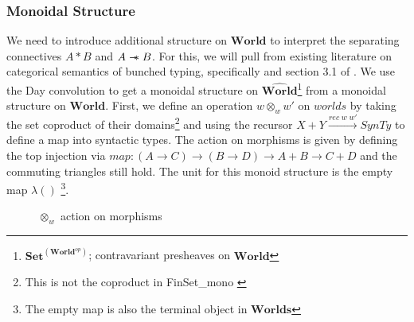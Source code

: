 \documentclass{article}
\newcommand{\sep}{\mathrel{-\mkern-6mu*}}
\newcommand{\pworld}{\widehat{\mathbf{World}}}
\newcommand{\world}{{\mathbf{World}}}
\begin{document}
 
\begin{comment}
Previously, I had maps between worlds as injections where the source map was 
included in the domain map. I've flipped the ordering to make the DCC obviously 
affine(monoidal unit is isomorphic to cartesian unit).    
\end{comment}



  \subsubsection{Monoidal Structure}

  We need to introduce additional structure on $\world$ to interpret the 
  separating connectives $A * B$ and $A\sep B$. For this, we will pull 
  from existing literature on categorical semantics of bunched typing, 
  specifically \cite{ohearnResourceInterpretationsBunched1999} and section 3.1 of \cite{pym_semantics_2002}. 
  We use the Day convolution \cite{nlabDayConv} to get a monoidal structure on 
  $\pworld$\footnote{$\mathbf{Set}^{(\world^{op})}$; contravariant presheaves on $\world$} 
  from a monoidal structure on $\world$. First, we define an operation $w \otimes_w w'$ on $worlds$ by taking 
  the set coproduct of their domains\footnote{This is not the coproduct in FinSet\_mono \cite{SE-FinSetMonoCoprod}} 
  and using the recursor $X + Y \xrightarrow{rec \; w \; w'} SynTy$ 
  to define a map into syntactic types. The action on morphisms 
  is given by defining the top injection via $map : (A \rightarrow C) \rightarrow 
  (B \rightarrow D) \rightarrow A + B \rightarrow C + D$ and the commuting triangles still hold. 
  The unit for this monoid structure is the empty map $\lambda()$ 
  \footnote{The empty map is also the terminal object in $\mathbf{Worlds}$}.

\begin{figure}[!ht]
    \centering
    \caption{$\otimes_w$ action on morphisms}
\end{figure}
\end{document}
